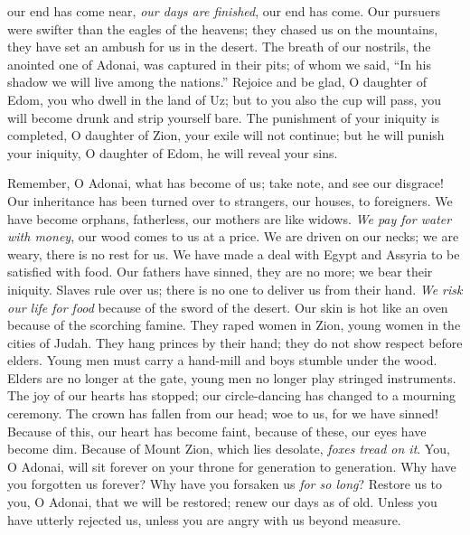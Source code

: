 \begin{biblechapter}
our end has come near, \textit{our days are finished}, 
our end has come.
\verse Our pursuers were swifter 
than the eagles of the heavens; 
they chased us on the mountains, 
they have set an ambush for us in the desert.
\verse The breath of our nostrils, the anointed one of Adonai, 
was captured in their pits; 
of whom we said, “In his shadow 
we will live among the nations.”
\verse Rejoice and be glad, O daughter of Edom, 
you who dwell in the land of Uz; 
but to you also the cup will pass, 
you will become drunk and strip yourself bare.
\verse The punishment of your iniquity is completed, O daughter of Zion, 
your exile will not continue; 
but he will punish your iniquity, O daughter of Edom, 
he will reveal your sins.
\end{biblechapter}

\begin{biblechapter} %
 Remember, O Adonai, what has become of us; 
take note, and see our disgrace!
\verse Our inheritance has been turned over to strangers, 
our houses, to foreigners.
\verse We have become orphans, fatherless, 
our mothers are like widows.
\verse \textit{We pay for water with money}, 
our wood comes to us at a price.
\verse We are driven on our necks; 
we are weary, there is no rest for us.
\verse We have made a deal with Egypt and Assyria 
to be satisfied with food.
\verse Our fathers have sinned, they are no more; 
we bear their iniquity.
\verse Slaves rule over us; 
there is no one to deliver us from their hand.
\verse \textit{We risk our life for food} 
because of the sword of the desert.
\verse Our skin is hot like an oven 
because of the scorching famine.
\verse They raped women in Zion, 
young women in the cities of Judah.
\verse They hang princes by their hand; 
they do not show respect before elders.
\verse Young men must carry a hand-mill 
and boys stumble under the wood.
\verse Elders are no longer at the gate, 
young men no longer play stringed instruments.
\verse The joy of our hearts has stopped; 
our circle-dancing has changed to a mourning ceremony.
\verse The crown has fallen from our head; 
woe to us, for we have sinned!
\verse Because of this, our heart has become faint, 
because of these, our eyes have become dim.
\verse Because of Mount Zion, which lies desolate, 
\textit{foxes tread on it}.
\verse You, O Adonai, will sit forever 
on your throne for generation to generation.
\verse Why have you forgotten us forever? 
Why have you forsaken us \textit{for so long}?
\verse Restore us to you, O Adonai, that we will be restored; 
renew our days as of old.
\verse Unless you have utterly rejected us, 
unless you are angry with us beyond measure.
\end{biblechapter}

